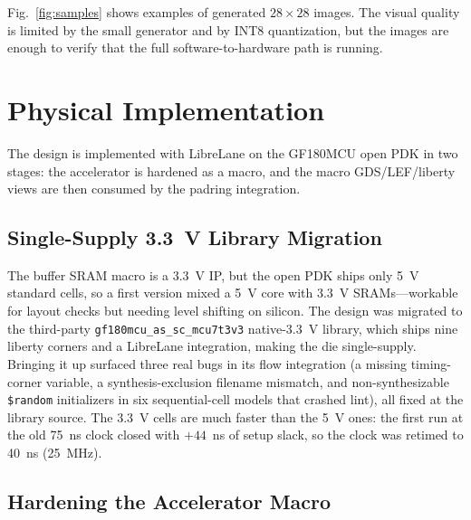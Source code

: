 \documentclass[conference,a4paper]{APSIPA2026}
\begin{document}
Fig.~\ref{fig:samples} shows examples of generated $28\times28$ images. The visual quality is limited by the small generator and by INT8 quantization, but the images are enough to verify that the full software-to-hardware path is running.

\section{Physical Implementation}\label{sec:phys}

The design is implemented with LibreLane \cite{librelane} on the GF180MCU open PDK \cite{gf180pdk} in two stages: the accelerator is hardened as a macro, and the macro GDS/LEF/liberty views are then consumed by the padring integration.

\subsection{Single-Supply 3.3~V Library Migration}
The buffer SRAM macro \cite{gf180sram} is a 3.3~V IP, but the open PDK ships only 5~V standard cells, so a first version mixed a 5~V core with 3.3~V SRAMs---workable for layout checks but needing level shifting on silicon. The design was migrated to the third-party \texttt{gf180mcu\_as\_sc\_mcu7t3v3} native-3.3~V library, which ships nine liberty corners and a LibreLane integration, making the die single-supply. Bringing it up surfaced three real bugs in its flow integration (a missing timing-corner variable, a synthesis-exclusion filename mismatch, and non-synthesizable \texttt{\$random} initializers in six sequential-cell models that crashed lint), all fixed at the library source. The 3.3~V cells are much faster than the 5~V ones: the first run at the old 75~ns clock closed with $+44$~ns of setup slack, so the clock was retimed to 40~ns (25~MHz).

\subsection{Hardening the Accelerator Macro}
\end{document}
